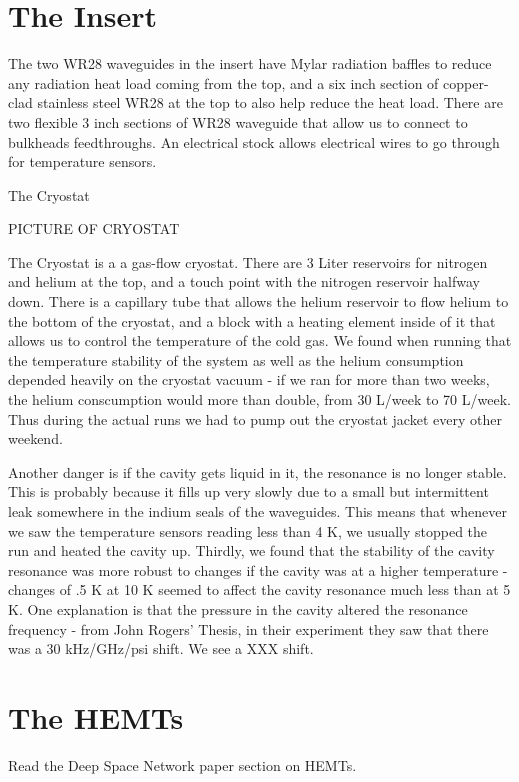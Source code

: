 \documentclass[11pt]{article}
\begin{document}
\section{The Insert}

The two WR28 waveguides in the insert have Mylar radiation baffles to reduce any radiation heat load coming from the top, and a six inch section of copper-clad stainless steel WR28 at the top to also help reduce the heat load. There are two flexible 3 inch sections of WR28 waveguide that allow us to connect to bulkheads feedthroughs. An electrical stock allows electrical wires to go through for temperature sensors. 

The Cryostat

PICTURE OF CRYOSTAT

The Cryostat is a a gas-flow cryostat. There are 3 Liter reservoirs for nitrogen and helium at the top, and a touch point with the nitrogen reservoir halfway down. There is a capillary tube that allows the helium reservoir to flow helium to the bottom of the cryostat, and a block with a heating element inside of it that allows us to control the temperature of the cold gas. We found when running that the temperature stability of the system as well as the helium consumption depended heavily on the cryostat vacuum - if we ran for more than two weeks, the helium conscumption would more than double, from 30 L/week to 70 L/week. Thus during the actual runs we had to pump out the cryostat jacket every other weekend. 

Another danger is if the cavity gets liquid in it, the resonance is no longer stable. This is probably because it fills up very slowly due to a small but intermittent leak somewhere in the indium seals of the waveguides. This means that whenever we saw the temperature sensors reading less than 4 K, we usually stopped the run and heated the cavity up. Thirdly, we found that the stability of the cavity resonance was more robust to changes if the cavity was at a higher temperature - changes of .5 K at 10 K seemed to affect the cavity resonance much less than at 5 K. One explanation is that the pressure in the cavity altered the resonance frequency - from John Rogers’ Thesis, in their experiment they saw that there was a 30 kHz/GHz/psi shift. We see a XXX shift.

\section{The HEMTs}

Read the Deep Space Network paper section on HEMTs.
\end{document}
